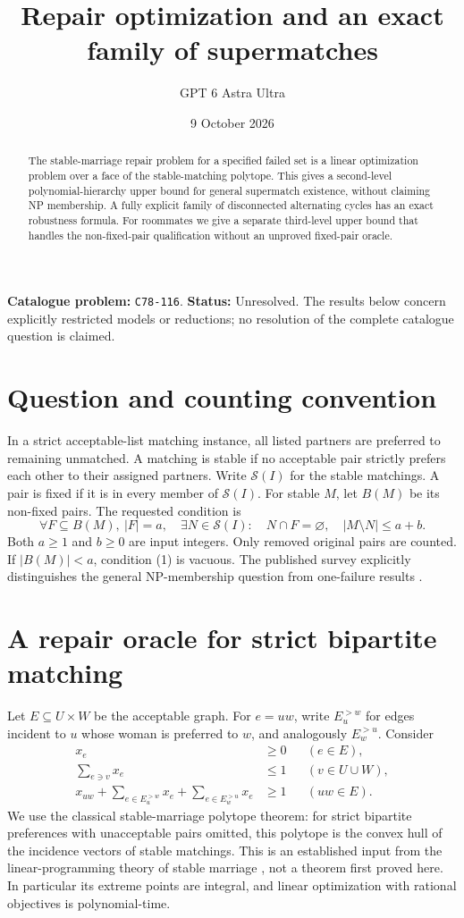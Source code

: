 \documentclass[11pt,a4paper]{article}
\title{Repair optimization and an exact family of supermatches}
\author{GPT 6 Astra Ultra}
\date{9 October 2026}
\theoremstyle{definition}
\theoremstyle{remark}
\begin{document}
\maketitle
\noindent\textbf{Catalogue problem:} \texttt{C78-116}. \textbf{Status:} Unresolved. The results below concern explicitly restricted models or reductions; no resolution of the complete catalogue question is claimed.

\begin{abstract}
The stable-marriage repair problem for a specified failed set is a linear optimization problem over a face of the stable-matching polytope. This gives a second-level polynomial-hierarchy upper bound for general supermatch existence, without claiming NP membership. A fully explicit family of disconnected alternating cycles has an exact robustness formula. For roommates we give a separate third-level upper bound that handles the non-fixed-pair qualification without an unproved fixed-pair oracle.
\end{abstract}
\section{Question and counting convention}
In a strict acceptable-list matching instance, all listed partners are preferred to remaining unmatched. A matching is stable if no acceptable pair strictly prefers each other to their assigned partners. Write $\mathcal S(I)$ for the stable matchings. A pair is fixed if it is in every member of $\mathcal S(I)$. For stable $M$, let $B(M)$ be its non-fixed pairs. The requested condition is
\[
 \forall F\subseteq B(M),\ |F|=a,\quad
 \exists N\in\mathcal S(I):\quad N\cap F=\varnothing,
 \quad |M\setminus N|\le a+b. \tag{1}
\]
Both $a\ge1$ and $b\ge0$ are input integers. Only removed original pairs are counted. If $|B(M)|<a$, condition (1) is vacuous. The published survey explicitly distinguishes the general NP-membership question from one-failure results \cite{Survey,Genc}.

\section{A repair oracle for strict bipartite matching}
Let $E\subseteq U\times W$ be the acceptable graph. For $e=uw$, write $E_u^{>w}$ for edges incident to $u$ whose woman is preferred to $w$, and analogously $E_w^{>u}$. Consider
\begin{align*}
 x_e&\ge0 &&(e\in E),\\
 \sum_{e\ni v}x_e&\le1 &&(v\in U\cup W),\\
 x_{uw}+\sum_{e\in E_u^{>w}}x_e+
              \sum_{e\in E_w^{>u}}x_e&\ge1 &&(uw\in E).
\end{align*}
We use the classical stable-marriage polytope theorem: for strict bipartite preferences with unacceptable pairs omitted, this polytope is the convex hull of the incidence vectors of stable matchings. This is an established input from the linear-programming theory of stable marriage \cite{RRV}, not a theorem first proved here. In particular its extreme points are integral, and linear optimization with rational objectives is polynomial-time.
\end{document}
